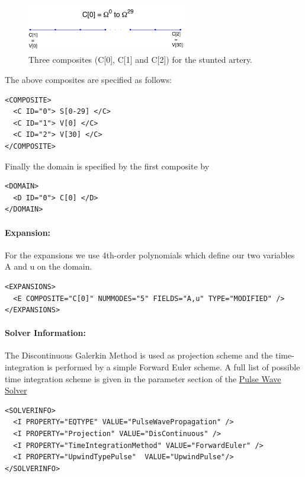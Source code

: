 \begin{figure}
\begin{center}
\includegraphics[width=7cm]{img/StentComposite.png}
\caption{Three composites (C[0], C[1] and C[2]) for the stunted artery.}
\end{center}
\end{figure}

The above composites are specified as follows:
\begin{lstlisting}[style=XMLStyle]
<COMPOSITE>
  <C ID="0"> S[0-29] </C>
  <C ID="1"> V[0] </C>
  <C ID="2"> V[30] </C>
</COMPOSITE>
\end{lstlisting}

Finally the domain is specified by the first composite by
\begin{lstlisting}[style=XMLStyle]
<DOMAIN> 
  <D ID="0"> C[0] </D>
</DOMAIN>
\end{lstlisting}

\paragraph{Expansion:~}For the expansions we use 4th-order polynomials which define our two variables A and u on the domain. 

\begin{lstlisting}[style=XMLStyle]
<EXPANSIONS>
  <E COMPOSITE="C[0]" NUMMODES="5" FIELDS="A,u" TYPE="MODIFIED" />
</EXPANSIONS>
\end{lstlisting}

\paragraph{Solver Information:~}The Discontinuous Galerkin Method is used as projection scheme and the time-integration is performed by a simple Forward Euler scheme. A full list of possible time integration scheme is given in the parameter section of the  \hyperref[PulseWaveSolver]{Pulse Wave Solver}
\begin{lstlisting}[style=XMLStyle] 
<SOLVERINFO>
  <I PROPERTY="EQTYPE" VALUE="PulseWavePropagation" />
  <I PROPERTY="Projection" VALUE="DisContinuous" />
  <I PROPERTY="TimeIntegrationMethod" VALUE="ForwardEuler" />
  <I PROPERTY="UpwindTypePulse"  VALUE="UpwindPulse"/> 
</SOLVERINFO>
\end{lstlisting}

